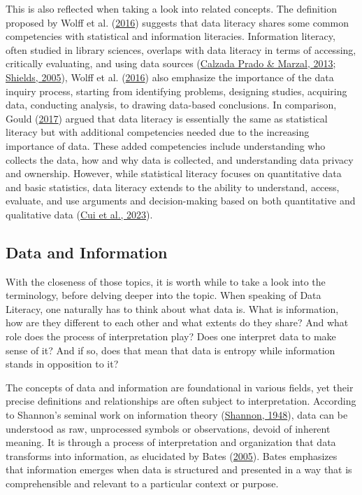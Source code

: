 \documentclass[
  12pt,
  a4paper,
  twoside]{article}
\begin{document}
This is also reflected when taking a look into related concepts.
The definition proposed by Wolff et al. (\protect\hyperlink{ref-wolff2016}{2016}) suggests that data literacy shares some common competencies with statistical and information literacies. Information literacy, often studied in library sciences, overlaps with data literacy in terms of accessing, critically evaluating, and using data sources (\protect\hyperlink{ref-prado2013}{Calzada Prado \& Marzal, 2013}; \protect\hyperlink{ref-shields2005}{Shields, 2005}), Wolff et al. (\protect\hyperlink{ref-wolff2016}{2016}) also emphasize the importance of the data inquiry process, starting from identifying problems, designing studies, acquiring data, conducting analysis, to drawing data-based conclusions.
In comparison, Gould (\protect\hyperlink{ref-gould2017}{2017}) argued that data literacy is essentially the same as statistical literacy but with additional competencies needed due to the increasing importance of data. These added competencies include understanding who collects the data, how and why data is collected, and understanding data privacy and ownership. However, while statistical literacy focuses on quantitative data and basic statistics, data literacy extends to the ability to understand, access, evaluate, and use arguments and decision-making based on both quantitative and qualitative data (\protect\hyperlink{ref-Cui2023}{Cui et al., 2023}).

\hypertarget{data-and-information}{%
\subsection{Data and Information}\label{data-and-information}}

With the closeness of those topics, it is worth while to take a look into the terminology, before delving deeper into the topic.
When speaking of Data Literacy, one naturally has to think about what data is. What is information, how are they different to each other and what extents do they share? And what role does the process of interpretation play? Does one interpret data to make sense of it? And if so, does that mean that data is entropy while information stands in opposition to it?

The concepts of data and information are foundational in various fields, yet their precise definitions and relationships are often subject to interpretation.
According to Shannon's seminal work on information theory (\protect\hyperlink{ref-shannon1948}{Shannon, 1948}), data can be understood as raw, unprocessed symbols or observations, devoid of inherent meaning. It is through a process of interpretation and organization that data transforms into information, as elucidated by Bates (\protect\hyperlink{ref-bates2005}{2005}). Bates emphasizes that information emerges when data is structured and presented in a way that is comprehensible and relevant to a particular context or purpose.
\end{document}
